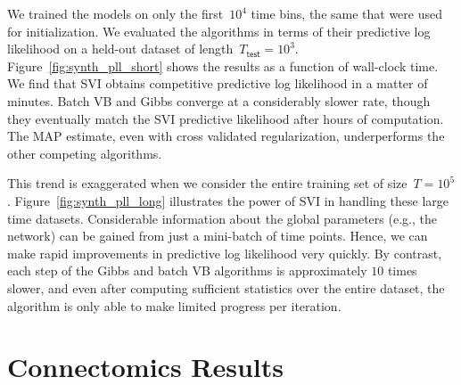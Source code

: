 We trained the models on only the first~$10^4$ time bins, the same
that were used for initialization.  We evaluated the algorithms in
terms of their predictive log likelihood on a held-out dataset of
length~$T_{\mathsf{test}}=10^3$.  Figure~\ref{fig:synth_pll_short}
shows the results as a function of wall-clock time.  We find that SVI
obtains competitive predictive log likelihood in a matter of minutes.
Batch VB and Gibbs converge at a considerably slower rate, though they
eventually match the SVI predictive likelihood after hours of
computation.  The MAP estimate, even with cross validated
regularization, underperforms the other competing algorithms.

This trend is exaggerated when we consider the entire training set of
size~$T=10^5$.  Figure~\ref{fig:synth_pll_long} illustrates the power
of SVI in handling these large time datasets.  Considerable
information about the global parameters (e.g., the network) can be
gained from just a mini-batch of time points.  Hence, we can make
rapid improvements in predictive log likelihood very quickly.  By
contrast, each step of the Gibbs and batch VB algorithms is
approximately $10$ times slower, and even after computing sufficient
statistics over the entire dataset, the algorithm is only able to make
limited progress per iteration.

\section{Connectomics Results}

